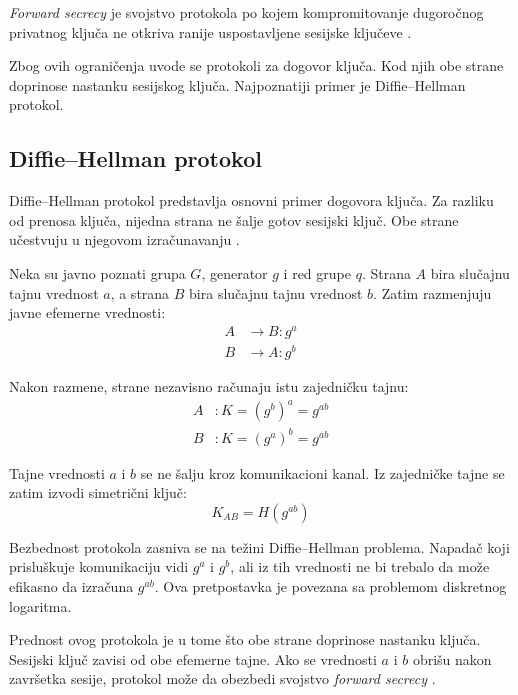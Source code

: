 \begin{definition}
\emph{Forward secrecy} je svojstvo protokola po kojem kompromitovanje dugoročnog privatnog ključa ne otkriva ranije uspostavljene sesijske ključeve \cite{smart2016cryptography}.
\end{definition}

Zbog ovih ograničenja uvode se protokoli za dogovor ključa. Kod njih obe strane doprinose nastanku sesijskog ključa. Najpoznatiji primer je Diffie--Hellman protokol.

\subsection{Diffie--Hellman protokol}

Diffie--Hellman protokol predstavlja osnovni primer dogovora ključa. Za razliku od prenosa ključa, nijedna strana ne šalje gotov sesijski ključ. Obe strane učestvuju u njegovom izračunavanju \cite{smart2016cryptography,stallings2011cryptography}.


Neka su javno poznati grupa \(G\), generator \(g\) i red grupe \(q\). Strana \(A\) bira slučajnu tajnu vrednost \(a\), a strana \(B\) bira slučajnu tajnu vrednost \(b\). Zatim razmenjuju javne efemerne vrednosti:
\[
\begin{aligned}
A &\rightarrow B : g^a \\
B &\rightarrow A : g^b
\end{aligned}
\]

Nakon razmene, strane nezavisno računaju istu zajedničku tajnu:
\[
\begin{aligned}
A &: K = (g^b)^a = g^{ab} \\
B &: K = (g^a)^b = g^{ab}
\end{aligned}
\]


Tajne vrednosti \(a\) i \(b\) se ne šalju kroz komunikacioni kanal. Iz zajedničke tajne se zatim izvodi simetrični ključ:
\[
K_{AB} = H(g^{ab})
\]

Bezbednost protokola zasniva se na težini Diffie--Hellman problema. Napadač koji prisluškuje komunikaciju vidi \(g^a\) i \(g^b\), ali iz tih vrednosti ne bi trebalo da može efikasno da izračuna \(g^{ab}\). Ova pretpostavka je povezana sa problemom diskretnog logaritma\cite{smart2016cryptography,stallings2011cryptography}.

Prednost ovog protokola je u tome što obe strane doprinose nastanku ključa. Sesijski ključ zavisi od obe efemerne tajne. Ako se vrednosti \(a\) i \(b\) obrišu nakon završetka sesije, protokol može da obezbedi svojstvo \emph{forward secrecy} \cite{smart2016cryptography}.



